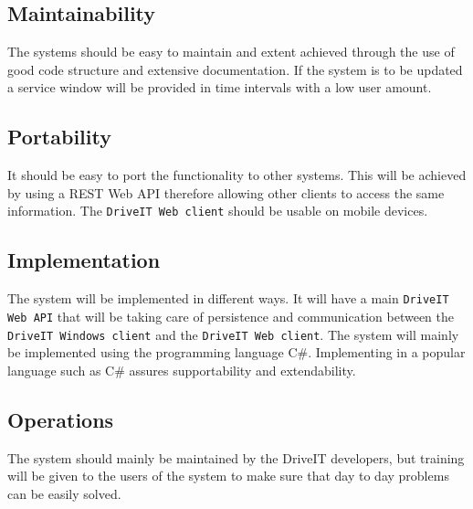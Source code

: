 \subsection{Maintainability}
The systems should be easy to maintain and extent achieved through the use of good code structure and extensive documentation. If the system is to be updated a service window will be provided in time intervals with a low user amount.

\subsection{Portability}
It should be easy to port the functionality to other systems. This will be achieved by using a REST Web API therefore allowing other clients to access the same information. The \texttt{DriveIT Web client} should be usable on mobile devices.

\subsection{Implementation}
The system will be implemented in different ways. It will have a main \texttt{DriveIT Web API} that will be taking care of persistence and communication between the \texttt{DriveIT Windows client} and the \texttt{DriveIT Web client}. The system will mainly be implemented using the programming language C\#. Implementing in a popular language such as C\# assures supportability and extendability. 

\subsection{Operations}
The system should mainly be maintained by the DriveIT developers, but training will be given to the users of the system to make sure that day to day problems can be easily solved.
